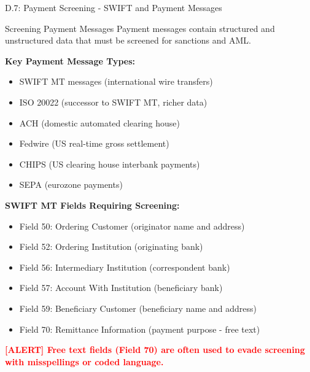 \documentclass[11pt,a4paper]{beamer}
\newcommand{\redflag}[1]{\textcolor{red}{\textbf{[ALERT] #1}}}
\begin{document}
\begin{frame}{D.7: Payment Screening - SWIFT and Payment Messages}
	\begin{block}{Screening Payment Messages}
		Payment messages contain structured and unstructured data that must be screened for sanctions and AML.
	\end{block}
	\textbf{Key Payment Message Types:}
	\begin{itemize}
		\item SWIFT MT messages (international wire transfers)
		\item ISO 20022 (successor to SWIFT MT, richer data)
		\item ACH (domestic automated clearing house)
		\item Fedwire (US real-time gross settlement)
		\item CHIPS (US clearing house interbank payments)
		\item SEPA (eurozone payments)
	\end{itemize}
	\textbf{SWIFT MT Fields Requiring Screening:}
	\begin{itemize}
		\item Field 50: Ordering Customer (originator name and address)
		\item Field 52: Ordering Institution (originating bank)
		\item Field 56: Intermediary Institution (correspondent bank)
		\item Field 57: Account With Institution (beneficiary bank)
		\item Field 59: Beneficiary Customer (beneficiary name and address)
		\item Field 70: Remittance Information (payment purpose - free text)
	\end{itemize}
	\redflag{Free text fields (Field 70) are often used to evade screening with misspellings or coded language.}
\end{frame}
\end{document}
